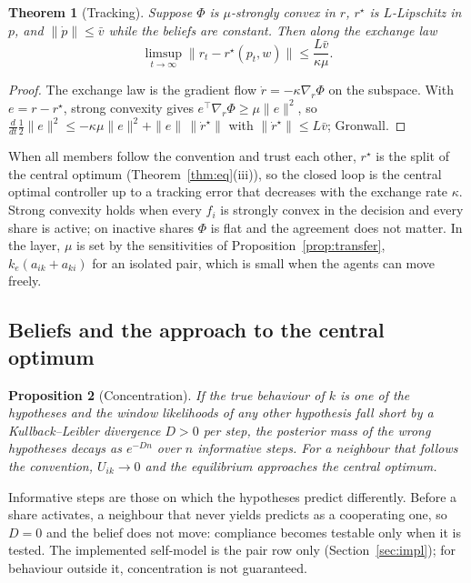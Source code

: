 \documentclass[11pt]{article}
\newtheorem{theorem}{Theorem}[section]
\newtheorem{proposition}[theorem]{Proposition}
\theoremstyle{definition}
\theoremstyle{remark}
\begin{document}
\begin{theorem}[Tracking]\label{thm:track}
Suppose $\Phi$ is $\mu$-strongly convex in $r$, $r^\star$ is $L$-Lipschitz in $p$, and $\|\dot p\|\le\bar v$ while the beliefs are constant. Then along the exchange law
\[
\limsup_{t\to\infty}\|r_t-r^\star(p_t,w)\|\le\frac{L\bar v}{\kappa\mu}.
\]
\end{theorem}
\begin{proof}
The exchange law is the gradient flow $\dot r=-\kappa\nabla_r\Phi$ on the subspace. With $e=r-r^\star$, strong convexity gives $e^\top\nabla_r\Phi\ge\mu\|e\|^2$, so $\frac{d}{dt}\frac12\|e\|^2\le-\kappa\mu\|e\|^2+\|e\|\,\|\dot r^\star\|$ with $\|\dot r^\star\|\le L\bar v$; Gronwall.
\end{proof}

When all members follow the convention and trust each other, $r^\star$ is the split of the central optimum (Theorem~\ref{thm:eq}(iii)), so the closed loop is the central optimal controller up to a tracking error that decreases with the exchange rate $\kappa$. Strong convexity holds when every $f_i$ is strongly convex in the decision and every share is active; on inactive shares $\Phi$ is flat and the agreement does not matter. In the layer, $\mu$ is set by the sensitivities of Proposition~\ref{prop:transfer}, $k_e(a_{ik}+a_{ki})$ for an isolated pair, which is small when the agents can move freely.

\subsection{Beliefs and the approach to the central optimum}\label{sec:beliefconc}
\begin{proposition}[Concentration]
If the true behaviour of $k$ is one of the hypotheses and the window likelihoods of any other hypothesis fall short by a Kullback--Leibler divergence $D>0$ per step, the posterior mass of the wrong hypotheses decays as $e^{-Dn}$ over $n$ informative steps. For a neighbour that follows the convention, $U_{ik}\to0$ and the equilibrium approaches the central optimum.
\end{proposition}

Informative steps are those on which the hypotheses predict differently. Before a share activates, a neighbour that never yields predicts as a cooperating one, so $D=0$ and the belief does not move: compliance becomes testable only when it is tested. The implemented self-model is the pair row only (Section~\ref{sec:impl}); for behaviour outside it, concentration is not guaranteed.
\end{document}
